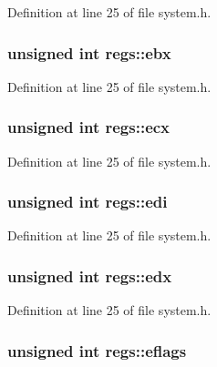 Definition at line 25 of file system.\+h.

\subsubsection[{\texorpdfstring{ebx}{ebx}}]{\setlength{\rightskip}{0pt plus 5cm}unsigned int regs\+::ebx}\hypertarget{structregs_a1d732c32ac0bd3f2c0a1b84fed7b6312}{}\label{structregs_a1d732c32ac0bd3f2c0a1b84fed7b6312}


Definition at line 25 of file system.\+h.

\subsubsection[{\texorpdfstring{ecx}{ecx}}]{\setlength{\rightskip}{0pt plus 5cm}unsigned int regs\+::ecx}\hypertarget{structregs_a32f7d03f98565974abed738eee025e62}{}\label{structregs_a32f7d03f98565974abed738eee025e62}


Definition at line 25 of file system.\+h.

\subsubsection[{\texorpdfstring{edi}{edi}}]{\setlength{\rightskip}{0pt plus 5cm}unsigned int regs\+::edi}\hypertarget{structregs_a273e21e568ee550e48dfc2799e5e7d56}{}\label{structregs_a273e21e568ee550e48dfc2799e5e7d56}


Definition at line 25 of file system.\+h.

\subsubsection[{\texorpdfstring{edx}{edx}}]{\setlength{\rightskip}{0pt plus 5cm}unsigned int regs\+::edx}\hypertarget{structregs_a5177b6604bc2937159c29899a0a6b94a}{}\label{structregs_a5177b6604bc2937159c29899a0a6b94a}


Definition at line 25 of file system.\+h.

\subsubsection[{\texorpdfstring{eflags}{eflags}}]{\setlength{\rightskip}{0pt plus 5cm}unsigned int regs\+::eflags}\hypertarget{structregs_a2394860816e82786acb64671237492b2}{}\label{structregs_a2394860816e82786acb64671237492b2}


